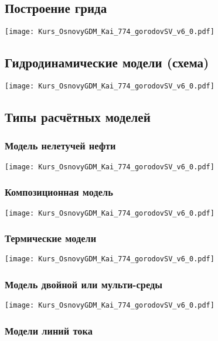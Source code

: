 \documentclass[main.tex]{subfiles}
\begin{document}
\subsection{Построение грида}

\texttt{[image: Kurs\_OsnovyGDM\_Kai\_774\_gorodovSV\_v6\_0.pdf]}

\subsection{Гидродинамические модели (схема)}

\texttt{[image: Kurs\_OsnovyGDM\_Kai\_774\_gorodovSV\_v6\_0.pdf]}

\subsection{Типы расчётных моделей}

\subsubsection{Модель нелетучей нефти}

\texttt{[image: Kurs\_OsnovyGDM\_Kai\_774\_gorodovSV\_v6\_0.pdf]}

\subsubsection{Композиционная модель}

\texttt{[image: Kurs\_OsnovyGDM\_Kai\_774\_gorodovSV\_v6\_0.pdf]}

\subsubsection{Термические модели}

\texttt{[image: Kurs\_OsnovyGDM\_Kai\_774\_gorodovSV\_v6\_0.pdf]}

\subsubsection{Модель двойной или мульти-среды}

\texttt{[image: Kurs\_OsnovyGDM\_Kai\_774\_gorodovSV\_v6\_0.pdf]}

\subsubsection{Модели линий тока}
\end{document}
